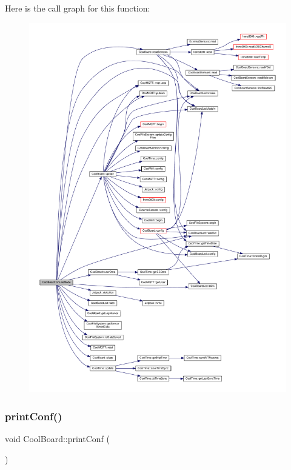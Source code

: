 Here is the call graph for this function\+:
\nopagebreak
\begin{figure}[H]
\begin{center}
\leavevmode
\includegraphics[width=350pt]{classCoolBoard_aa0bbc4bc605e35618d18e68795c61363_cgraph}
\end{center}
\end{figure}
\mbox{\label{classCoolBoard_a486507b8f0981d3cc671ed31c2145755}} 
\subsubsection{\texorpdfstring{print\+Conf()}{printConf()}}
{\footnotesize\ttfamily void Cool\+Board\+::print\+Conf (\begin{DoxyParamCaption}{ }\end{DoxyParamCaption})}

